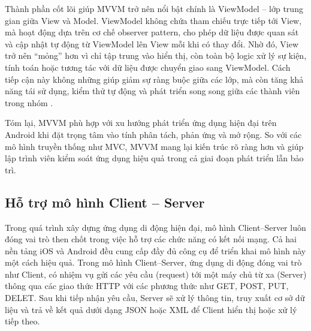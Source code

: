     \begin{flushleft}
      \hspace*{0.8cm}Thành phần cốt lõi giúp MVVM trở nên nổi bật chính là ViewModel – lớp trung gian giữa View và Model. ViewModel không chứa tham chiếu trực tiếp tới View, mà hoạt động dựa trên cơ chế observer pattern, cho phép dữ liệu được quan sát và cập nhật tự động từ ViewModel lên View mỗi khi có thay đổi. Nhờ đó, View trở nên “mỏng” hơn vì chỉ tập trung vào hiển thị, còn toàn bộ logic xử lý sự kiện, tính toán hoặc tương tác với dữ liệu được chuyển giao sang ViewModel. Cách tiếp cận này không những giúp giảm sự ràng buộc giữa các lớp, mà còn tăng khả năng tái sử dụng, kiểm thử tự động và phát triển song song giữa các thành viên trong nhóm \cite{testability_mvvm}.
    \end{flushleft}

    \begin{flushleft}
        \hspace*{0.8cm}Tóm lại, MVVM phù hợp với xu hướng phát triển ứng dụng hiện đại trên Android khi đặt trọng tâm vào tính phân tách, phản ứng và mở rộng. So với các mô hình truyền thống như MVC, MVVM mang lại kiến trúc rõ ràng hơn và giúp lập trình viên kiểm soát ứng dụng hiệu quả trong cả giai đoạn phát triển lẫn bảo trì.
    \end{flushleft}

\subsection{Hỗ trợ mô hình Client – Server}
\renewcommand{\labelitemi}{--}    
    \begin{flushleft}
        \hspace*{0.8cm}Trong quá trình xây dựng ứng dụng di động hiện đại, mô hình Client–Server luôn đóng vai trò then chốt trong việc hỗ trợ các chức năng có kết nối mạng. Cả hai nền tảng iOS và Android đều cung cấp đầy đủ công cụ để triển khai mô hình này một cách hiệu quả. Trong mô hình Client–Server, ứng dụng di động đóng vai trò như Client, có nhiệm vụ gửi các yêu cầu (request) tới một máy chủ từ xa (Server) thông qua các giao thức HTTP với các phương thức như GET, POST, PUT, DELET. Sau khi tiếp nhận yêu cầu, Server sẽ xử lý thông tin, truy xuất cơ sở dữ liệu và trả về kết quả dưới dạng JSON hoặc XML để Client hiển thị hoặc xử lý tiếp theo.
    \end{flushleft}

